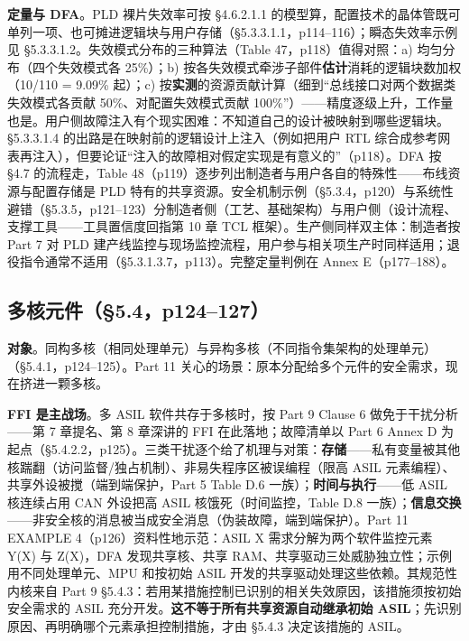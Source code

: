 \textbf{定量与 DFA}。PLD 裸片失效率可按 §4.6.2.1.1 的模型算，配置技术的晶体管既可单列一项、也可摊进逻辑块与用户存储（§5.3.3.1.1，p114–116）；瞬态失效率示例见 §5.3.3.1.2。失效模式分布的三种算法（Table 47，p118）值得对照：a) 均匀分布（四个失效模式各 25\%）；b) 按各失效模式牵涉子部件\textbf{估计}消耗的逻辑块数加权（10/110 = 9.09\% 起）；c) 按\textbf{实测}的资源贡献计算（细到“总线接口对两个数据类失效模式各贡献 50\%、对配置失效模式贡献 100\%”）——精度逐级上升，工作量也是。用户侧故障注入有个现实困难：不知道自己的设计被映射到哪些逻辑块。§5.3.3.1.4 的出路是在映射前的逻辑设计上注入（例如把用户 RTL 综合成参考网表再注入），但要论证“注入的故障相对假定实现是有意义的”（p118）。DFA 按 §4.7 的流程走，Table 48（p119）逐步列出制造者与用户各自的特殊性——布线资源与配置存储是 PLD 特有的共享资源。安全机制示例（§5.3.4，p120）与系统性避错（§5.3.5，p121–123）分制造者侧（工艺、基础架构）与用户侧（设计流程、支撑工具——工具置信度回指第 10 章 TCL 框架）。生产侧同样双主体：制造者按 Part 7 对 PLD 建产线监控与现场监控流程，用户参与相关项生产时同样适用；退役指令通常不适用（§5.3.1.3.7，p113）。完整定量判例在 Annex E（p177–188）。

\subsection{多核元件（§5.4，p124–127）}

\textbf{对象}。同构多核（相同处理单元）与异构多核（不同指令集架构的处理单元）（§5.4.1，p124–125）。Part 11 关心的场景：原本分配给多个元件的安全需求，现在挤进一颗多核。

\textbf{FFI 是主战场}。多 ASIL 软件共存于多核时，按 Part 9 Clause 6 做免于干扰分析——第 7 章提名、第 8 章深讲的 FFI 在此落地；故障清单以 Part 6 Annex D 为起点（§5.4.2.2，p125）。三类干扰逐个给了机理与对策：\textbf{存储}——私有变量被其他核踹翻（访问监督/独占机制）、非易失程序区被误编程（限高 ASIL 元素编程）、共享外设被搅（端到端保护，Part 5 Table D.6 一族）；\textbf{时间与执行}——低 ASIL 核连续占用 CAN 外设把高 ASIL 核饿死（时间监控，Table D.8 一族）；\textbf{信息交换}——非安全核的消息被当成安全消息（伪装故障，端到端保护）。Part 11 EXAMPLE 4（p126）资料性地示范：ASIL X 需求分解为两个软件监控元素 Y(X) 与 Z(X)，DFA 发现共享核、共享 RAM、共享驱动三处威胁独立性；示例用不同处理单元、MPU 和按初始 ASIL 开发的共享驱动处理这些依赖。其规范性内核来自 Part 9 §5.4.3：若用某措施控制已识别的相关失效原因，该措施须按初始安全需求的 ASIL 充分开发。\textbf{这不等于所有共享资源自动继承初始 ASIL}；先识别原因、再明确哪个元素承担控制措施，才由 §5.4.3 决定该措施的 ASIL。

